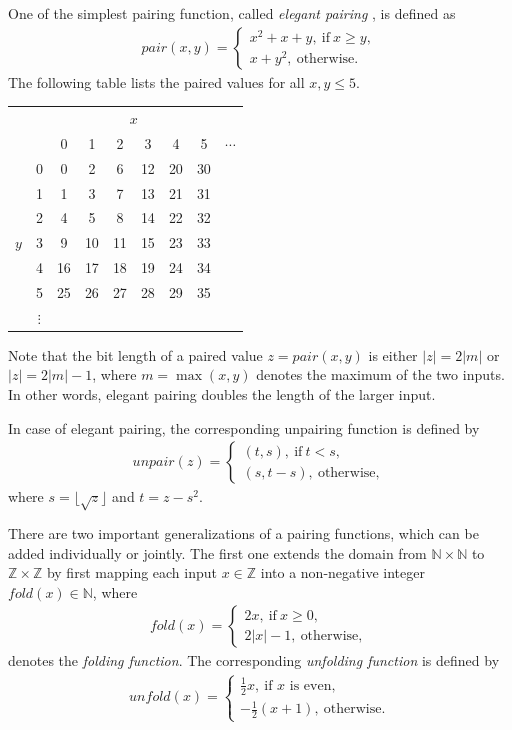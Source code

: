 \documentclass[bibtotoc,halfparskip,oneside]{scrreprt}
\begin{document}
	One of the simplest pairing function, called \emph{elegant pairing} \cite{szudzik06}, is defined as 
	\begin{align}
		\mathit{pair}(x,y) = \begin{cases}x^2+x +y,~\text{if}~x\geq y, \\ x+y^2,~\text{otherwise}. \end{cases}
	\end{align}
	The following table lists the paired values for all $x,y\leq 5$.
	\begin{center}
		\begin{tabular}{cc|ccccccc}
			\multicolumn{2}{c}{}& \multicolumn{6}{c}{$x$} \\
			&   & 0 & 1 & 2 & 3 & 4 & 5 & $\cdots$ \\\cline{2-9}
			& 0 & 0 & 2 & 6 & 12& 20& 30& \\
			& 1 & 1 & 3 & 7 & 13& 21& 31& \\
			& 2 & 4 & 5 & 8 & 14& 22& 32& \\
			$y$ & 3 & 9 & 10& 11& 15& 23& 33& \\
			& 4 & 16& 17& 18& 19& 24& 34& \\
			& 5 & 25& 26& 27& 28& 29& 35& \\
			& $\vdots$ & & & & & & & \\
		\end{tabular} 
	\end{center}
	Note that the bit length of a paired value $z=\mathit{pair}(x,y)$ is either $|z| =2|m|$ or $|z|=2|m|-1$, where $m=\max(x,y)$ denotes the maximum of the two inputs. In other words, elegant pairing doubles the length of the larger input.
	
	In case of elegant pairing, the corresponding unpairing function is defined by
	\begin{align}
		\mathit{unpair}(z)=\begin{cases}(t,s),~\text{if}~t<s,\\(s,t-s),~\text{otherwise},\end{cases}
	\end{align}
	where $s=\lfloor\sqrt{z}\rfloor$ and $t=z-s^2$.
	
	There are two important generalizations of a pairing functions, which can be added individually or jointly. The first one extends the domain from $\mathbb{N}\times\mathbb{N}$ to $\mathbb{Z}\times\mathbb{Z}$ by first mapping each input $x\in\mathbb{Z}$ into a non-negative integer $\mathit{fold}(x)\in\mathbb{N}$, where
	\begin{align}
		\mathit{fold}(x)=\begin{cases}2x,~\text{if}~x\geq 0,\\2|x|-1,~\text{otherwise},\end{cases}
	\end{align}
	denotes the \emph{folding function}. The corresponding \emph{unfolding function} is defined by
	\begin{align}
		\mathit{unfold}(x)=\begin{cases}\frac{1}{2}x,~\text{if $x$ is even},\\
			-\frac{1}{2}(x+1),~\text{otherwise}.\end{cases}
	\end{align}
	
\end{document}
